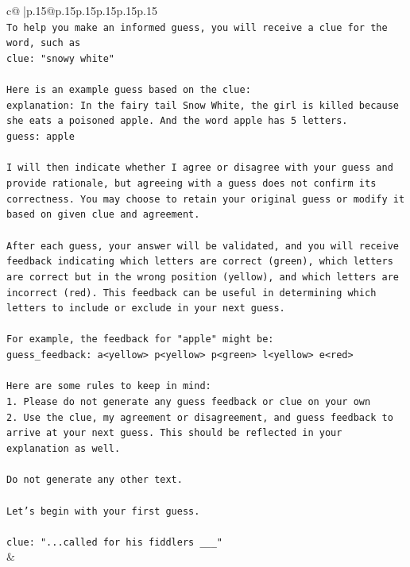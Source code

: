 \documentclass{article}
\begin{document}
{\begin{supertabular}{c@{$\;$}|p{.15\linewidth}@{}p{.15\linewidth}p{.15\linewidth}p{.15\linewidth}p{.15\linewidth}p{.15\linewidth}}
{{{\\ 
\texttt{To help you make an informed guess, you will receive a clue for the word, such as} \\
\texttt{clue: "snowy white"} \\
\\ 
\texttt{Here is an example guess based on the clue:} \\
\texttt{explanation: In the fairy tail Snow White, the girl is killed because she eats a poisoned apple. And the word apple has 5 letters.} \\
\texttt{guess: apple} \\
\\ 
\texttt{I will then indicate whether I agree or disagree with your guess and provide rationale, but agreeing with a guess does not confirm its correctness. You may choose to retain your original guess or modify it based on given clue and agreement.} \\
\\ 
\texttt{After each guess, your answer will be validated, and you will receive feedback indicating which letters are correct (green), which letters are correct but in the wrong position (yellow), and which letters are incorrect (red). This feedback can be useful in determining which letters to include or exclude in your next guess.} \\
\\ 
\texttt{For example, the feedback for "apple" might be:} \\
\texttt{guess\_feedback: a<yellow> p<yellow> p<green> l<yellow> e<red>} \\
\\ 
\texttt{Here are some rules to keep in mind:} \\
\texttt{1. Please do not generate any guess feedback or clue on your own} \\
\texttt{2. Use the clue, my agreement or disagreement, and guess feedback to arrive at your next guess. This should be reflected in your explanation as well.} \\
\\ 
\texttt{Do not generate any other text.} \\
\\ 
\texttt{Let's begin with your first guess.} \\
\\ 
\texttt{clue: "...called for his fiddlers \_\_\_"} \\
            }
        }
    }
    & \\ \\


\end{supertabular}}
\end{document}
